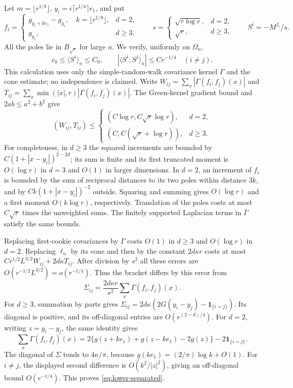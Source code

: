 Let $m=\lfloor r^{1/8}\rfloor$,
$y_i=i\lceil r^{1/4}\rceil e_1$, and put
\[
 f_i=\begin{cases}g_{y_i+ke_1}-g_{y_i},\quad k=\lfloor r^{1/8}\rfloor,
                         &d=2,\\g_{y_i},&d\geq3,
       \end{cases}
 \qquad
 s=\begin{cases}\sqrt{r\log r},&d=2,\\\sqrt r,&d\geq3,
      \end{cases}
 \qquad S^i=-M^{f_i}/s.
\]
All the poles lie in $B_{\sqrt r}$ for large $n$.
We verify, uniformly on $\Omega_n$,
\begin{equation}\label{eq:lower-separated}
 c_0\leq\langle S^i\rangle_n\leq C_0,
 \qquad |\langle S^i,S^j\rangle_n|\leq Cr^{-1/4}\quad(i\ne j).
\end{equation}
This calculation uses only the simple-random-walk covariance kernel
$\Gamma$ and the cone estimate; no independence is claimed.
Write $W_{ij}=\sum_x|\Gamma(f_i,f_j)(x)|$ and
$T_{ij}=\sum_x\min(|x|,r)|\Gamma(f_i,f_j)(x)|$.
The Green-kernel gradient bound and $2ab\leq a^2+b^2$ give
\[
 (W_{ij},T_{ij})\leq
 \begin{cases}(C\log r,C\sqrt r\log r),&d=2,\\
                  (C,C(\sqrt r+\log r)),&d\geq3.
       \end{cases}
\]
For completeness, in $d\geq3$ the squared increments are bounded
by $C(1+|x-y_i|)^{2-2d}$; its sum is finite and its first truncated
moment is $O(\log r)$ in $d=3$ and $O(1)$ in larger dimensions.
In $d=2$, an increment of $f_i$ is bounded by the sum of reciprocal
distances to its two poles within distance $3k$, and by
$Ck(1+|x-y_i|)^{-2}$ outside.  Squaring and summing gives
$O(\log r)$ and a first moment $O(k\log r)$, respectively.
Translation of the poles costs at most $C\sqrt r$ times the
unweighted sums.  The finitely supported Laplacian terms in
$\Gamma$ satisfy the same bounds.

Replacing first-cookie covariances by $\Gamma$ costs $O(1)$ in
$d\geq3$ and $O(\log r)$ in $d=2$.
Replacing $\ell_n$ by its cone and then by the constant $2d\kappa r$
costs at most $Cr^{1/2}L^{3/2}W_{ij}+2d\kappa T_{ij}$.
After division by $s^2$ all these errors are
$O(r^{-1/2}L^{3/2})=o(r^{-1/4})$.
Thus the bracket differs by this error from
\[
 \Sigma_{ij}=\frac{2d\kappa r}{s^2}
                         \sum_x\Gamma(f_i,f_j)(x).
\]
For $d\geq3$, summation by parts gives
$\Sigma_{ij}=2d\kappa(2G(y_i-y_j)-\mathbf1_{\{i=j\}})$.
Its diagonal is positive, and its off-diagonal entries are
$O(r^{(2-d)/4})$.
For $d=2$, writing $z=y_i-y_j$, the same identity gives
\[
 \sum_x\Gamma(f_i,f_j)(x)
   =2\{g(z+ke_1)+g(z-ke_1)-2g(z)\}-2\mathbf1_{\{i=j\}}.
\]
The diagonal of $\Sigma$ tends to $4\kappa/\pi$, because
$g(ke_1)=(2/\pi)\log k+O(1)$.
For $i\ne j$, the displayed second difference is
$O(k^2/|z|^2)$, giving an off-diagonal bound $O(r^{-1/4})$.
This proves \eqref{eq:lower-separated}.

